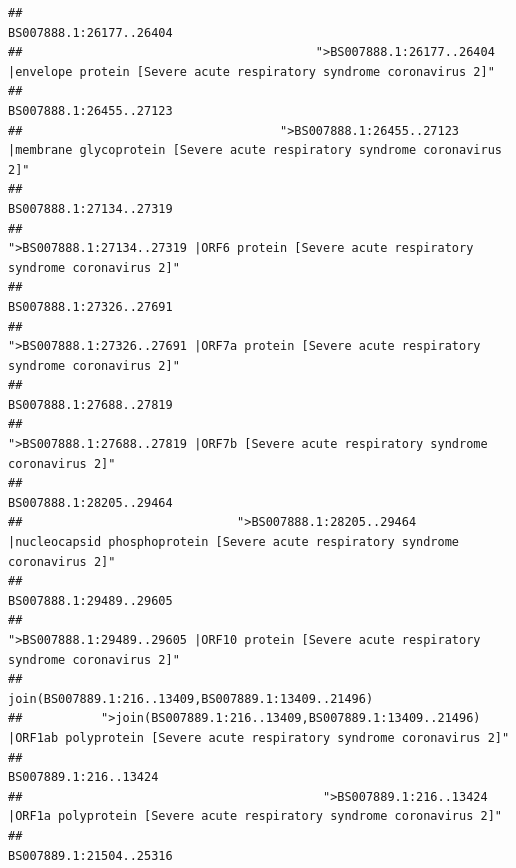 \documentclass[
]{article}
\begin{document}
\begin{verbatim}
##                                                                                                                BS007888.1:26177..26404 
##                                         ">BS007888.1:26177..26404 |envelope protein [Severe acute respiratory syndrome coronavirus 2]" 
##                                                                                                                BS007888.1:26455..27123 
##                                    ">BS007888.1:26455..27123 |membrane glycoprotein [Severe acute respiratory syndrome coronavirus 2]" 
##                                                                                                                BS007888.1:27134..27319 
##                                             ">BS007888.1:27134..27319 |ORF6 protein [Severe acute respiratory syndrome coronavirus 2]" 
##                                                                                                                BS007888.1:27326..27691 
##                                            ">BS007888.1:27326..27691 |ORF7a protein [Severe acute respiratory syndrome coronavirus 2]" 
##                                                                                                                BS007888.1:27688..27819 
##                                                    ">BS007888.1:27688..27819 |ORF7b [Severe acute respiratory syndrome coronavirus 2]" 
##                                                                                                                BS007888.1:28205..29464 
##                              ">BS007888.1:28205..29464 |nucleocapsid phosphoprotein [Severe acute respiratory syndrome coronavirus 2]" 
##                                                                                                                BS007888.1:29489..29605 
##                                            ">BS007888.1:29489..29605 |ORF10 protein [Severe acute respiratory syndrome coronavirus 2]" 
##                                                                                    join(BS007889.1:216..13409,BS007889.1:13409..21496) 
##           ">join(BS007889.1:216..13409,BS007889.1:13409..21496) |ORF1ab polyprotein [Severe acute respiratory syndrome coronavirus 2]" 
##                                                                                                                  BS007889.1:216..13424 
##                                          ">BS007889.1:216..13424 |ORF1a polyprotein [Severe acute respiratory syndrome coronavirus 2]" 
##                                                                                                                BS007889.1:21504..25316 

\end{verbatim}
\end{document}
